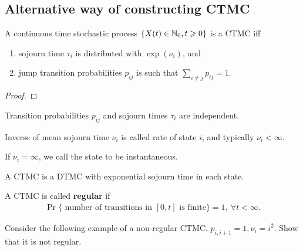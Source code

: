 \documentclass[a4paper,10pt,english]{article}
\begin{document}
\subsection{Alternative way of constructing CTMC}
\begin{prop} A continuous time stochastic process $\{X(t) \in \mathbb{N}_0, t \geqslant 0 \}$ is a CTMC iff \begin{enumerate}
\item sojourn time $\tau_i$ is distributed with $\exp(\nu_i)$, and 
\item jump transition probabilities $p_{ij}$ is such that $\sum_{i \neq j}p_{ij}=1$.
\end{enumerate}
\end{prop}
\begin{proof}
\end{proof}
\begin{rem}
Transition probabilities $p_{ij}$ and sojourn times $\tau_i$ are independent. 
\end{rem}
\begin{rem} Inverse of mean sojourn time $\nu_i$ is called rate of state $i$, and typically $\nu_i < \infty$.  
\end{rem}
\begin{rem} If $\nu_i = \infty$, we call the state to be instantaneous. 
\end{rem}
\begin{rem}  A CTMC is a DTMC with exponential sojourn time in each state.
\end{rem}
\begin{defn} A CTMC is called \textbf{regular} if 
\begin{align*}
\Pr\{ \text{ number of transitions in } [0,t] \text{ is finite}\} = 1,~ \forall t < \infty.
\end{align*} 
\end{defn}
\begin{exmp} Consider the following example of a non-regular CTMC. $p_{i,i+1}=1, \nu_i = i^2$. Show that it is not regular.
\end{exmp}
\end{document}

